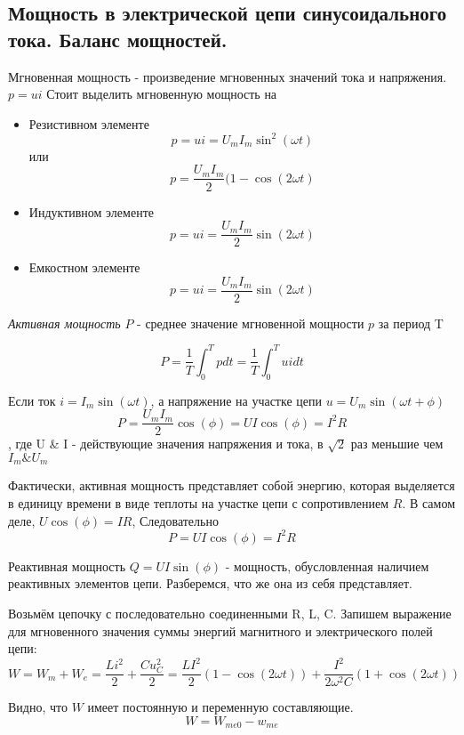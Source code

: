 \subsection{Мощность в электрической цепи синусоидального тока. Баланс мощностей.}

Мгновенная мощность - произведение мгновенных значений тока и напряжения.
$p=u i$
Стоит выделить мгновенную мощность на
\begin{itemize}
\item Резистивном элементе
$$
p=ui = U_m I_m \sin^2(\omega t)
$$
или
$$
p = \frac{U_m I_m}{2} (1- \cos(2\omega t)
$$
\item Индуктивном элементе
$$
p=ui= \frac{U_m I_m}{2} \sin(2\omega t)
$$
\item Емкостном элементе
$$
p=ui = \frac{U_m I_m}{2} \sin(2\omega t)
$$
\end{itemize}

{\slshape Активная мощность} $P$  - среднее значение мгновенной мощности $p$ за период T

\begin{equation}
P=\frac{1}{T} \int_0^T pdt = \frac{1}{T} \int_0^T uidt
\end{equation}

Если ток $i = I_m\sin(\omega t)$, а напряжение на участке цепи $u = U_m\sin(\omega t + \phi)$ 
\begin{equation}
P = \frac{U_m I_m}{2}\cos(\phi) = UI\cos(\phi)  = I^2 R
\end{equation}
, где U \& I - действующие значения напряжения и тока, в $\sqrt{2}$ раз меньшие чем $I_m \& U_m$

Фактически, активная мощность представляет собой энергию, которая выделяется в единицу времени в виде теплоты на участке цепи с сопротивлением $R$. В самом деле,
$U\cos(\phi) = IR$, Следовательно
$$
P = UI\cos(\phi) = I^2R
$$

Реактивная мощность $Q = U I \sin(\phi)$ - мощность, обусловленная наличием реактивных элементов цепи. Разберемся, что же она из себя представляет.

Возьмём цепочку с последовательно соединенными R, L, C. Запишем выражение для мгновенного значения суммы энергий магнитного и электрического полей цепи:
$$
W = W_m + W_e = \frac{Li^2}{2} + \frac{Cu_C^2}{2} = \frac{LI^2}{2}(1-\cos(2\omega t)) + \frac{I^2}{2\omega^2 C}(1 + \cos(2\omega t))
$$

Видно, что $W$ имеет постоянную и переменную составляющие. 
$$
W = W_{me0} - w_{me}
$$

